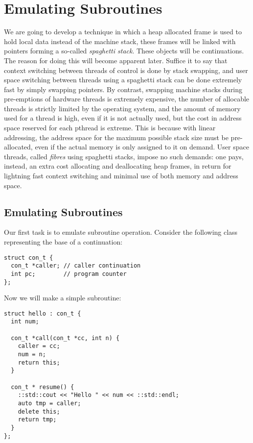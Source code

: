 \documentclass[oneside]{book}
\begin{document}
\section{Emulating Subroutines}
We are going to develop a technique in which a heap allocated frame is
used to hold local data instead of the machine stack, these frames
will be linked with pointers forming a so-called {\em spaghetti stack}.
These objects will be continuations. The reason for doing this will
become apparent later. Suffice it to say that context switching
between threads of control is done by stack swapping, and user space
switching between threads using a spaghetti stack can be done extremely
fast by simply swapping pointers. By contrast, swapping machine stacks
during pre-emptions of hardware threads is extremely expensive, the
number of allocable threads is strictly limited by the operating system,
and the amount of memory used for a thread is high, even if it
is not actually used, but the cost in address space reserved for each pthread
is extreme. This is because with linear addressing, the address space for
the maximum possible stack size must be pre-allocated, even if the actual
memory is only assigned to it on demand. User space threads, called {\em fibres}
using spaghetti stacks, impose no such demands: one pays, instead, an extra 
cost allocating and deallocating heap frames, in return for lightning fast
context switching and minimal use of both memory and address space.

\subsection{Emulating Subroutines}
Our first task is to emulate subroutine operation.
Consider the following class representing the base
of a continuation:

\begin{verbatim}
struct con_t {
  con_t *caller; // caller continuation
  int pc;        // program counter
};
\end{verbatim}

Now we will make a simple subroutine:

\begin{verbatim}
struct hello : con_t {
  int num;

  con_t *call(con_t *cc, int n) { 
    caller = cc;
    num = n; 
    return this;
  }

  con_t * resume() {
    ::std::cout << "Hello " << num << ::std::endl;
    auto tmp = caller;
    delete this; 
    return tmp; 
  }
};
\end{verbatim}
\end{document}

